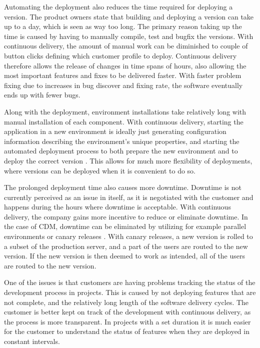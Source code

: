 \documentclass[english]{tktltiki2}
\theoremstyle{definition}
\theoremstyle{remark}
\begin{document}
Automating the deployment also reduces the time required for deploying a version. The product owners state that building and deploying a version can take up to a day, which is seen as way too long. The primary reason taking up the time is caused by having to manually compile, test and bugfix the versions. With continuous delivery, the amount of manual work can be diminished to couple of button clicks defining which customer profile to deploy. Continuous delivery therefore allows the release of changes in time spans of hours, also allowing the most important features and fixes to be delivered faster. With faster problem fixing due to increases in bug discover and fixing rate, the software eventually ends up with fewer bugs. %

Along with the deployment, environment installations take relatively long with manual installation of each component. With continuous delivery, starting the application in a new environment is ideally just generating configuration information describing the environment's unique properties, and starting the automated deployment process to both prepare the new environment and to deploy the correct version \cite{cdbook}. This allows for much more flexibility of deployments, where versions can be deployed when it is convenient to do so.

The prolonged deployment time also causes more downtime. Downtime is not currently perceived as an issue in itself, as it is negotiated with the customer and happens during the hours where downtime is acceptable. With continuous delivery, the company gains more incentive to reduce or eliminate downtime. In the case of CDM, downtime can be eliminated by utilizing for example parallel environments or canary releases \cite{cdbook}. With canary releases, a new version is rolled to a subset of the production server, and a part of the users are routed to the new version. If the new version is then deemed to work as intended, all of the users are routed to the new version.

One of the issues is that customers are having problems tracking the status of the development process in projects. This is caused by not deploying features that are not complete, and the relatively long length of the software delivery cycles. The customer is better kept on track of the development with continuous delivery, as the process is more transparent. In projects with a set duration it is much easier for the customer to understand the status of features when they are deployed in constant intervals.
\end{document}

